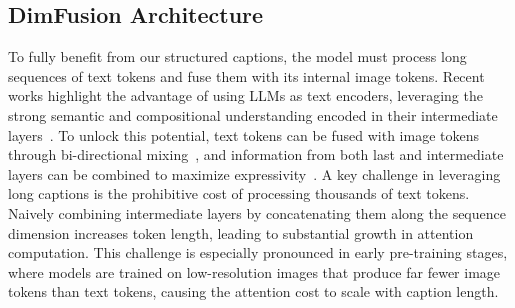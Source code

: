 \subsection{DimFusion Architecture}
\label{sec:dimfusion}




To fully benefit from our structured captions, the model must process long sequences of text tokens and fuse them with its internal image tokens. Recent works highlight the advantage of using LLMs as text encoders, leveraging the strong semantic and compositional understanding encoded in their intermediate layers~\cite{durrani2020analyzing,dar2022analyzing,rombach2022high}. To unlock this potential, text tokens can be fused with image tokens through bi-directional mixing~\cite{esser2024scaling}, and information from both last and intermediate layers can be combined to maximize expressivity~\cite{cai2025hidream}. A key challenge in leveraging long captions is the prohibitive cost of processing thousands of text tokens. Naively combining intermediate layers by concatenating them along the sequence dimension increases token length, leading to substantial growth in attention computation. This challenge is especially pronounced in early pre-training stages, where models are trained on low-resolution images that produce far fewer image tokens than text tokens, causing the attention cost to scale with caption length.




